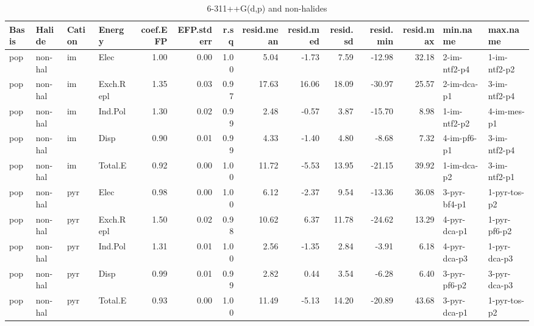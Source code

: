 \documentclass[a4paper]{article}
\begin{document}
\begin{landscape}
\begin{table}[ht]
\centering
\begin{tabular}{llllrrrrrrrrll}
  \hline
Basis & Halide & Cation & Energy & coef.EFP & EFP.stderr & r.sq & resid.mean & resid.med & resid.sd & resid.min & resid.max & min.name & max.name \\ 
  \hline
pop & non-hal & im & Elec & 1.00 & 0.00 & 1.00 & 5.04 & -1.73 & 7.59 & -12.98 & 32.18 & 2-im-ntf2-p4 & 1-im-ntf2-p2 \\ 
  pop & non-hal & im & Exch.Repl & 1.35 & 0.03 & 0.97 & 17.63 & 16.06 & 18.09 & -30.97 & 25.57 & 2-im-dca-p1 & 3-im-ntf2-p4 \\ 
  pop & non-hal & im & Ind.Pol & 1.30 & 0.02 & 0.99 & 2.48 & -0.57 & 3.87 & -15.70 & 8.98 & 1-im-ntf2-p2 & 4-im-mes-p1 \\ 
  pop & non-hal & im & Disp & 0.90 & 0.01 & 0.99 & 4.33 & -1.40 & 4.80 & -8.68 & 7.32 & 4-im-pf6-p1 & 3-im-ntf2-p4 \\ 
  pop & non-hal & im & Total.E & 0.92 & 0.00 & 1.00 & 11.72 & -5.53 & 13.95 & -21.15 & 39.92 & 1-im-dca-p2 & 3-im-ntf2-p1 \\ 
  pop & non-hal & pyr & Elec & 0.98 & 0.00 & 1.00 & 6.12 & -2.37 & 9.54 & -13.36 & 36.08 & 3-pyr-bf4-p1 & 1-pyr-tos-p2 \\ 
  pop & non-hal & pyr & Exch.Repl & 1.50 & 0.02 & 0.98 & 10.62 & 6.37 & 11.78 & -24.62 & 13.29 & 4-pyr-dca-p1 & 1-pyr-pf6-p2 \\ 
  pop & non-hal & pyr & Ind.Pol & 1.31 & 0.01 & 1.00 & 2.56 & -1.35 & 2.84 & -3.91 & 6.18 & 4-pyr-dca-p3 & 1-pyr-dca-p3 \\ 
  pop & non-hal & pyr & Disp & 0.99 & 0.01 & 0.99 & 2.82 & 0.44 & 3.54 & -6.28 & 6.40 & 3-pyr-pf6-p2 & 3-pyr-dca-p3 \\ 
  pop & non-hal & pyr & Total.E & 0.93 & 0.00 & 1.00 & 11.49 & -5.13 & 14.20 & -20.89 & 43.68 & 3-pyr-dca-p1 & 1-pyr-tos-p2 \\ 
   \hline
\end{tabular}
\caption{6-311++G(d,p) and non-halides}
\end{table}


\end{landscape}
\end{document}
